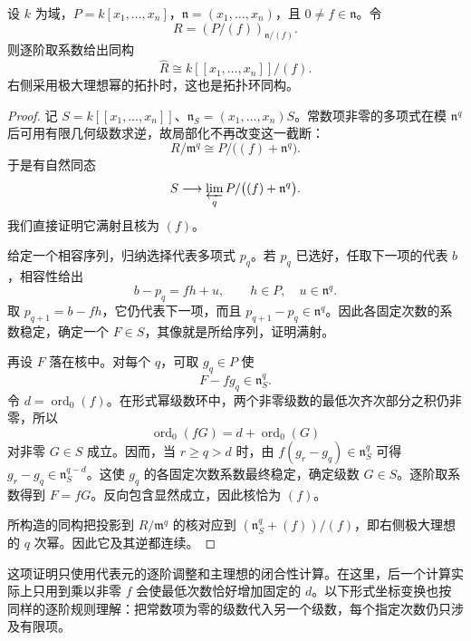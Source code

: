 \begin{proposition}
\label{g5:prop:principal-formal-completion}
	设 \(k\) 为域，\(P=k[x_1,\ldots,x_n]\)，\(\mathfrak n=(x_1,\ldots,x_n)\)，且 \(0\ne f\in\mathfrak n\)。令
	\[
		R=(P/(f))_{\mathfrak n/(f)}.
	\]
	则逐阶取系数给出同构
	\[
		\widehat R\cong k[[x_1,\ldots,x_n]]/(f).
	\]
	右侧采用极大理想幂的拓扑时，这也是拓扑环同构。
\end{proposition}
\begin{proof}
	记 \(S=k[[x_1,\ldots,x_n]]\)、\(\mathfrak n_S=(x_1,\ldots,x_n)S\)。常数项非零的多项式在模 \(\mathfrak n^q\) 后可用有限几何级数求逆，故局部化不再改变这一截断：
	\[
		R/\mathfrak m^q\cong P/\bigl((f)+\mathfrak n^q\bigr).
	\]
	于是有自然同态
	\[
		S\longrightarrow\varprojlim_q P/\bigl((f)+\mathfrak n^q\bigr).
	\]
	我们直接证明它满射且核为 \((f)\)。

	给定一个相容序列，归纳选择代表多项式 \(p_q\)。若 \(p_q\) 已选好，任取下一项的代表 \(b\)，相容性给出
	\[
		b-p_q=fh+u,\qquad h\in P,\quad u\in\mathfrak n^q.
	\]
	取 \(p_{q+1}=b-fh\)，它仍代表下一项，而且 \(p_{q+1}-p_q\in\mathfrak n^q\)。因此各固定次数的系数稳定，确定一个 \(F\in S\)，其像就是所给序列，证明满射。

	再设 \(F\) 落在核中。对每个 \(q\)，可取 \(g_q\in P\) 使
	\[
		F-fg_q\in\mathfrak n_S^q.
	\]
	令 \(d=\operatorname{ord}_0(f)\)。在形式幂级数环中，两个非零级数的最低次齐次部分之积仍非零，所以
	\[
		\operatorname{ord}_0(fG)=d+\operatorname{ord}_0(G)
	\]
	对非零 \(G\in S\) 成立。因而，当 \(r\geq q>d\) 时，由
	\(f(g_r-g_q)\in\mathfrak n_S^q\)
	可得 \(g_r-g_q\in\mathfrak n_S^{q-d}\)。这使 \(g_q\) 的各固定次数系数最终稳定，确定级数 \(G\in S\)。逐阶取系数得到 \(F=fG\)。反向包含显然成立，因此核恰为 \((f)\)。

	所构造的同构把投影到 \(R/\mathfrak m^q\) 的核对应到
	\((\mathfrak n_S^q+(f))/(f)\)，即右侧极大理想的 \(q\) 次幂。因此它及其逆都连续。
\end{proof}

这项证明只使用代表元的逐阶调整和主理想的闭合性计算。在这里，后一个计算实际上只用到乘以非零 \(f\) 会使最低次数恰好增加固定的 \(d\)。以下形式坐标变换也按同样的逐阶规则理解：把常数项为零的级数代入另一个级数，每个指定次数仍只涉及有限项。

